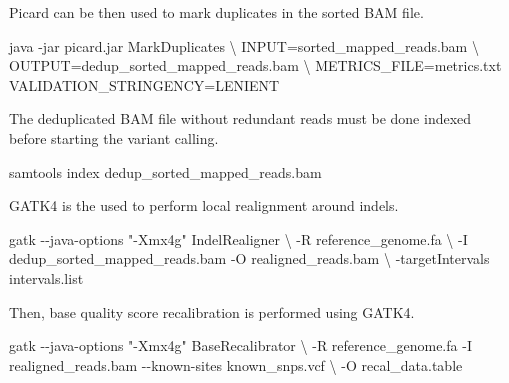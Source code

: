 \documentclass[
]{book}
\newenvironment{Shaded}{\begin{snugshade}}{\end{snugshade}}
\newcommand{\AttributeTok}[1]{\textcolor[rgb]{0.77,0.63,0.00}{#1}}
\newcommand{\DataTypeTok}[1]{\textcolor[rgb]{0.13,0.29,0.53}{#1}}
\newcommand{\ExtensionTok}[1]{#1}
\newcommand{\NormalTok}[1]{#1}
\newcommand{\StringTok}[1]{\textcolor[rgb]{0.31,0.60,0.02}{#1}}
\begin{document}
\normalsize

Picard can be then used to mark duplicates in the sorted BAM file.
\small

\begin{Shaded}
\begin{Highlighting}[]
\ExtensionTok{java} \AttributeTok{{-}jar}\NormalTok{ picard.jar MarkDuplicates }\DataTypeTok{\textbackslash{}}
\NormalTok{      INPUT=sorted\_mapped\_reads.bam }\DataTypeTok{\textbackslash{}}
\NormalTok{      OUTPUT=dedup\_sorted\_mapped\_reads.bam }\DataTypeTok{\textbackslash{}}
\NormalTok{      METRICS\_FILE=metrics.txt VALIDATION\_STRINGENCY=LENIENT}
\end{Highlighting}
\end{Shaded}

\normalsize

The deduplicated BAM file without redundant reads must be done indexed before starting the variant calling.
\small

\begin{Shaded}
\begin{Highlighting}[]
\ExtensionTok{samtools}\NormalTok{ index dedup\_sorted\_mapped\_reads.bam}
\end{Highlighting}
\end{Shaded}

\normalsize

GATK4 is the used to perform local realignment around indels.
\small

\begin{Shaded}
\begin{Highlighting}[]
\ExtensionTok{gatk} \AttributeTok{{-}{-}java{-}options} \StringTok{"{-}Xmx4g"}\NormalTok{ IndelRealigner }\DataTypeTok{\textbackslash{}}
      \AttributeTok{{-}R}\NormalTok{ reference\_genome.fa }\DataTypeTok{\textbackslash{}}
      \AttributeTok{{-}I}\NormalTok{ dedup\_sorted\_mapped\_reads.bam}
      \ExtensionTok{{-}O}\NormalTok{ realigned\_reads.bam }\DataTypeTok{\textbackslash{}}
      \AttributeTok{{-}targetIntervals}\NormalTok{ intervals.list}
\end{Highlighting}
\end{Shaded}

\normalsize

Then, base quality score recalibration is performed using GATK4.
\small

\begin{Shaded}
\begin{Highlighting}[]
\ExtensionTok{gatk} \AttributeTok{{-}{-}java{-}options} \StringTok{"{-}Xmx4g"}\NormalTok{ BaseRecalibrator }\DataTypeTok{\textbackslash{}}
      \AttributeTok{{-}R}\NormalTok{ reference\_genome.fa}
      \ExtensionTok{{-}I}\NormalTok{ realigned\_reads.bam}
      \ExtensionTok{{-}{-}known{-}sites}\NormalTok{ known\_snps.vcf }\DataTypeTok{\textbackslash{}}
      \AttributeTok{{-}O}\NormalTok{ recal\_data.table}
\end{Highlighting}
\end{Shaded}
\end{document}
